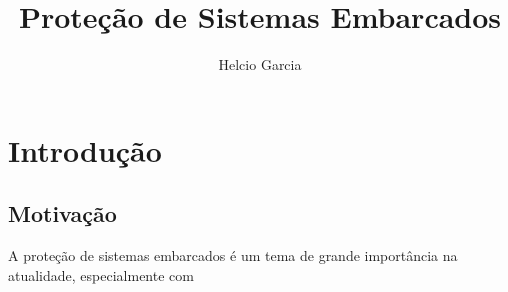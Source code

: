 \documentclass[12pt,a4paper]{report}
\begin{document}
\title{Proteção de Sistemas Embarcados}
\author{Helcio Garcia}
\maketitle
\tableofcontents
\chapter{Introdução}
\section{Motivação}
A proteção de sistemas embarcados é um tema de grande importância na atualidade, especialmente com
\printbibliography
\end{document}

